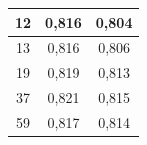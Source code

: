 \documentclass{classrep}
\begin{document}
{\begin{table}[H]
\begin{center}
\begin{tabular}{|c|c|c|}
12                       & 0,816                                                                      & 0,804                                                                          \\ \hline
13                       & 0,816                                                                      & 0,806                                                                          \\ \hline
19                       & 0,819                                                                      & 0,813                                                                          \\ \hline
37                       & 0,821                                                                      & 0,815                                                                          \\ \hline
59                       & 0,817                                                                      & 0,814                                                                          \\ \hline
\end{tabular}
\end{center}
\end{table}

}
\end{document}
